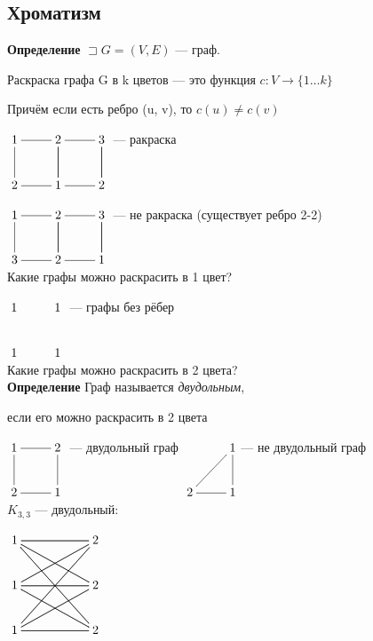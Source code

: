 \documentclass[a4paper, 12pt] {article}
\begin{document}
\begin{equation}\label{eq2}
\end{equation}
\subsection{Хроматизм}

\textbf{Определение} $ \sqsupset G = (V, E)$ --- граф.

Раскраска графа G в k цветов --- это функция $c: V \rightarrow \{1 \dots k\}$

Причём если есть ребро (u, v), то $ c(u) \ne c(v)$

$\xymatrix{
	1 \ar@{-}[r] & 2 \ar@{-}[d]  \ar@{-}[r] & 3 \ar@{-}[d] \\
	2 \ar@{-}[u] \ar@{-}[r]  & 1   \ar@{-}[u] \ar@{-}[r]  & 2   \ar@{-}[u] \\
}$ --- ракраска

$\xymatrix{
	1 \ar@{-}[r] & 2 \ar@{-}[d]  \ar@{-}[r] & 3 \ar@{-}[d] \\
	3 \ar@{-}[u] \ar@{-}[r]  & 2   \ar@{-}[u] \ar@{-}[r]  & 1   \ar@{-}[u] \\
}$ --- не ракраска (существует ребро 2-2)\\

Какие графы можно раскрасить в 1 цвет?

$\xymatrix{
	1  & 1  \\
	1  & 1  \\
}$ --- графы без рёбер\\

Какие графы можно раскрасить в 2 цвета?\\

\textbf{Определение} Граф называется \textit{двудольным}, 

если его можно раскрасить в 2 цвета

$\xymatrix{
	1 \ar@{-}[r] \ar@{-}[d] & 2  \\
	2  & 1 \ar@{-}[l] \ar@{-}[u] \\
}$ --- двудольный граф
$\xymatrix{
	& 1 \ar@{-}[d]   \\
	2 \ar@{-}[ru] &  1 \ar@{-}[l] \\
}$--- не двудольный граф\\


$ K_{3,3}$ --- двудольный:

$\xymatrix{
	1 \ar@{-}[rr] \ar@{-}[rrd] \ar@{-}[rrdd] & & 2 \ar@{-}[ll] \ar@{-}[lld] \ar@{-}[lldd]\\
	1 \ar@{-}[rr] \ar@{-}[rrd] \ar@{-}[rru] & & 2 \ar@{-}[ll] \ar@{-}[lld] \ar@{-}[llu]\\
	1 \ar@{-}[rr] \ar@{-}[rru] \ar@{-}[rruu] & & 2 \ar@{-}[ll] \ar@{-}[llu] \ar@{-}[lluu]\\
}$\\
\end{document}
